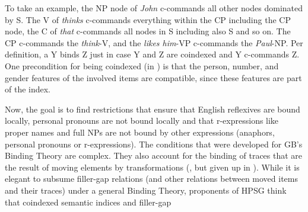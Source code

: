 \documentclass[output=paper,biblatex,babelshorthands,newtxmath,draftmode,colorlinks,citecolor=brown]{langscibook}
\begin{document}
To take an example, the NP node of \emph{John} c-commands all other nodes dominated by S. The V of
\emph{thinks} c-commands everything within the CP including the CP node, the C of \emph{that}
c-commands all nodes in S including also S and so on. The CP c-commands the \emph{think}-V, and the
\emph{likes him}-VP c-commands the \emph{Paul}-NP. Per definition, a Y binds Z just in case Y and Z
are coindexed and Y c-commands Z. One precondition for being coindexed (in ) is that the
person, number, and gender features of the involved items are compatible, since these features are
part of the index. 

Now, the goal is to find restrictions that ensure that English reflexives are bound locally, personal
pronouns are not bound locally and that r-expressions like proper names and full NPs are
not bound by other expressions (anaphors, personal pronouns or r-expressions).
 The conditions that were developed for
GB's Binding Theory are complex. They also account for the binding of traces that are the result of
moving elements by transformations (\citealp{Chomsky81a}, but given up in
\citealp{Chomsky86a}).\label{page-traces-binding} While it is elegant to subsume filler-gap relations (and other relations
between moved items and their traces) under a general Binding Theory, proponents of HPSG think that
coindexed semantic indices and filler-gap
\end{document}
